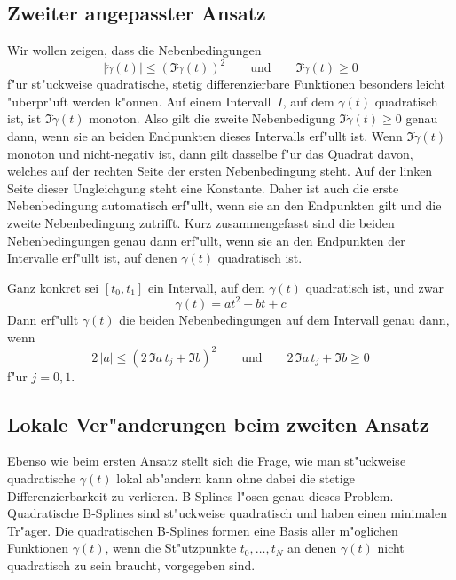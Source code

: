 \documentclass[a4paper]{scrartcl}
\begin{document}
\subsection{Zweiter angepasster Ansatz} \label{sec:2ndansatz}

Wir wollen zeigen, dass die Nebenbedingungen 
$$ \lvert\ddot\gamma(t)\rvert \le (\Im\dot\gamma(t))^2 
\qquad \text{und} \qquad
\Im\dot\gamma(t)\ge0 $$
f"ur st"uckweise quadratische, stetig differenzierbare Funktionen besonders leicht "uberpr"uft werden k"onnen. 
Auf einem Intervall~$I$, auf dem $\gamma(t)$ quadratisch ist, ist $\Im\dot\gamma(t)$ monoton. 
Also gilt die zweite Nebenbedigung $\Im\dot\gamma(t)\ge0$ genau dann, wenn sie an beiden Endpunkten dieses Intervalls erf"ullt ist. 
Wenn $\Im\dot\gamma(t)$ monoton und nicht-negativ ist, dann gilt dasselbe f"ur das Quadrat davon, welches auf der rechten Seite der ersten Nebenbedingung steht. 
Auf der linken Seite dieser Ungleichgung steht eine Konstante. 
Daher ist auch die erste Nebenbedingung automatisch erf"ullt, wenn sie an den Endpunkten gilt und die zweite Nebenbedingung zutrifft. 
Kurz zusammengefasst sind die beiden Nebenbedingungen genau dann erf"ullt, wenn sie an den Endpunkten der Intervalle erf"ullt ist, auf denen $\gamma(t)$ quadratisch ist.

Ganz konkret sei $[t_0,t_1]$ ein Intervall, auf dem $\gamma(t)$ quadratisch ist, und zwar
$$ \gamma(t) = at^2 + bt + c $$
Dann erf"ullt $\gamma(t)$ die beiden Nebenbedingungen auf dem Intervall genau dann, wenn 
$$ 2\,\lvert a\rvert \le (2\,\Im a\,t_j + \Im b)^2
\qquad \text{und} \qquad
2\,\Im a\,t_j + \Im b\ge 0 $$
f"ur $j=0,1$. 


\subsection{Lokale Ver"anderungen beim zweiten Ansatz} \label{sec:2ndansatzLocalChanges}

Ebenso wie beim ersten Ansatz stellt sich die Frage, wie man st"uckweise quadratische $\gamma(t)$ lokal ab"andern kann ohne dabei die stetige Differenzierbarkeit zu verlieren. 
B-Splines l"osen genau dieses Problem. 
Quadratische B-Splines sind st"uckweise quadratisch und haben einen minimalen Tr"ager. 
Die quadratischen B-Splines formen eine Basis aller m"oglichen Funktionen $\gamma(t)$, wenn die St"utzpunkte $t_0,\dotsc, t_N$ an denen $\gamma(t)$ nicht quadratisch zu sein braucht, vorgegeben sind. 
\end{document}
